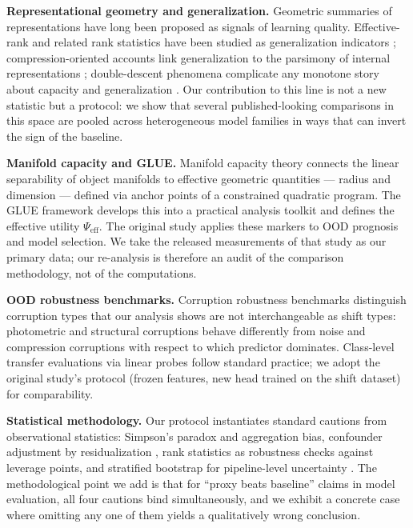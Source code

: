 \documentclass[10pt]{article} %
\begin{document}
\textbf{Representational geometry and generalization.} Geometric summaries of representations have long been proposed as signals of learning quality. Effective-rank and related rank statistics have been studied as generalization indicators \citep{jiang2020fantastic}; compression-oriented accounts link generalization to the parsimony of internal representations \citep{sorscher2022neural}; double-descent phenomena complicate any monotone story about capacity and generalization \citep{nakkiran2020deep}. Our contribution to this line is not a new statistic but a protocol: we show that several published-looking comparisons in this space are pooled across heterogeneous model families in ways that can invert the sign of the baseline.

\textbf{Manifold capacity and GLUE.} Manifold capacity theory \citep{chung2018classification} connects the linear separability of object manifolds to effective geometric quantities --- radius and dimension --- defined via anchor points of a constrained quadratic program. The GLUE framework \citep{chou2025feature} develops this into a practical analysis toolkit and defines the effective utility $\Psi_{\mathrm{eff}}$. The original study \citep{chou2026diagnosing} applies these markers to OOD prognosis and model selection. We take the released measurements of that study as our primary data; our re-analysis is therefore an audit of the comparison methodology, not of the computations.

\textbf{OOD robustness benchmarks.} Corruption robustness benchmarks \citep{hendrycks2019benchmarking} distinguish corruption types that our analysis shows are not interchangeable as shift types: photometric and structural corruptions behave differently from noise and compression corruptions with respect to which predictor dominates. Class-level transfer evaluations via linear probes follow standard practice; we adopt the original study's protocol (frozen features, new head trained on the shift dataset) for comparability.

\textbf{Statistical methodology.} Our protocol instantiates standard cautions from observational statistics: Simpson's paradox and aggregation bias, confounder adjustment by residualization \citep{pearl2009causality}, rank statistics as robustness checks against leverage points, and stratified bootstrap for pipeline-level uncertainty \citep{efron1993bootstrap}. The methodological point we add is that for ``proxy beats baseline'' claims in model evaluation, all four cautions bind simultaneously, and we exhibit a concrete case where omitting any one of them yields a qualitatively wrong conclusion.
\end{document}
